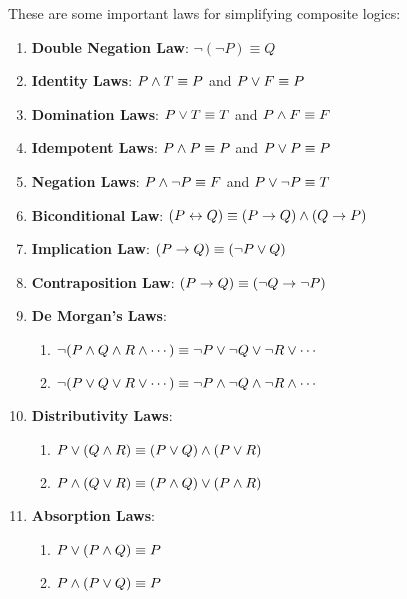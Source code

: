 \begin{theorem}
    These are some important laws for simplifying composite logics:
    \begin{enumerate}
        \item \textbf{Double Negation Law}: $\neg(\neg P) \equiv Q$
        \item \textbf{Identity Laws}: $P \wedge T \equiv P$ and $P \vee F \equiv P$
        \item \textbf{Domination Laws}: $P \vee T \equiv T$ and $P \wedge F \equiv F$
        \item \textbf{Idempotent Laws}: $P \wedge P \equiv P$ and $P \vee P \equiv P$
        \item \textbf{Negation Laws}: $P \wedge \neg P \equiv F$ and $P \vee \neg P \equiv T$
        \item \textbf{Biconditional Law}: $(P \leftrightarrow Q) \equiv (P \rightarrow Q) \wedge (Q \rightarrow P)$
        \item \textbf{Implication Law}: $(P \rightarrow Q) \equiv (\neg P \vee Q)$
        \item \textbf{Contraposition Law}: $(P \rightarrow Q) \equiv (\neg Q \rightarrow \neg P)$
        \item \textbf{De Morgan's Laws}:
        \begin{enumerate}
            \item $\neg(P \wedge Q \wedge R \wedge \cdots) \equiv \neg P \vee \neg Q \vee \neg R \vee \cdots$
            \item $\neg(P \vee Q \vee R \vee \cdots) \equiv \neg P \wedge \neg Q \wedge \neg R \wedge \cdots$
        \end{enumerate}
        \item \textbf{Distributivity Laws}:
        \begin{enumerate}
            \item $P \vee (Q \wedge R) \equiv (P \vee Q) \wedge (P \vee R)$
            \item $P \wedge (Q \vee R) \equiv (P \wedge Q) \vee (P \wedge R)$
        \end{enumerate}
        \item \textbf{Absorption Laws}:
        \begin{enumerate}
            \item $P \vee (P \wedge Q) \equiv P$
            \item $P \wedge (P \vee Q) \equiv P$
        \end{enumerate}
    \end{enumerate}
\end{theorem}